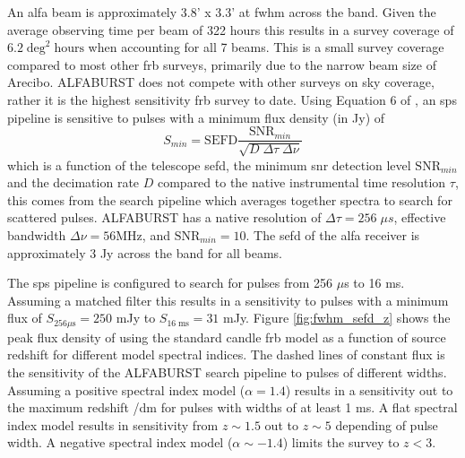 \documentclass[a4paper,fleqn,usenatbib]{mnras}
\begin{document}
An \gls*{alfa} beam is approximately 3.8' x 3.3' at \gls*{fwhm} across the band.
Given the average observing time per beam of 322 hours this results in a survey
coverage of $6.2 \; \textrm{deg}^2 \; \textrm{hours}$ when accounting for all 7
beams. This is a small survey coverage compared to most other \gls{frb} surveys,
primarily due to the narrow beam size of Arecibo. ALFABURST does not compete
with other surveys on sky coverage, rather it is the highest sensitivity
\gls{frb} survey to date.  Using Equation 6 of \cite{2015MNRAS.452.1254K}, an
\gls*{sps} pipeline is sensitive to pulses with a minimum flux density (in Jy)
of
%
\begin{equation}
S_{min} = \textrm{SEFD} \frac{\textrm{SNR}_{min}}{\sqrt{D \; \Delta \tau \;
\Delta \nu}}
\end{equation}
%
which is a function of the telescope \gls*{sefd}, the minimum \gls*{snr}
detection level $\textrm{SNR}_{min}$ and the decimation rate $D$ compared to the
native instrumental time resolution $\tau$, this comes from the search pipeline
which averages together spectra to search for scattered pulses. ALFABURST has a
native resolution of $\Delta \tau = 256 \; \mu s$, effective bandwidth $\Delta
\nu = 56 \textrm{MHz}$, and $\textrm{SNR}_{min} = 10$. The \gls*{sefd} of the
\gls*{alfa} receiver is approximately 3 Jy across the band for all beams.

The \gls{sps} pipeline is configured to search for pulses from 256 $\mu$s to 16
ms. Assuming a matched filter this results in a sensitivity to pulses with a
minimum flux of $S_{256 \mu\textrm{s}} = 250$ mJy to $S_{16 \; \textrm{ms}} =
31$ mJy. Figure \ref{fig:fwhm_sefd_z} shows the peak flux density of using the
standard candle \gls{frb} model as a function of source redshift for different
model spectral indices. The dashed lines of constant flux is the sensitivity of
the ALFABURST search pipeline to pulses of different widths. Assuming a positive
spectral index model ($\alpha=1.4$) results in a sensitivity out to the maximum redshift
/\gls{dm} for pulses with widths of at least 1 ms. A flat spectral index model
results in sensitivity from $z \sim 1.5$ out to $z \sim 5$ depending of pulse
width. A negative spectral index model ($\alpha \sim -1.4$) limits the survey to
$z < 3$.
\end{document}
